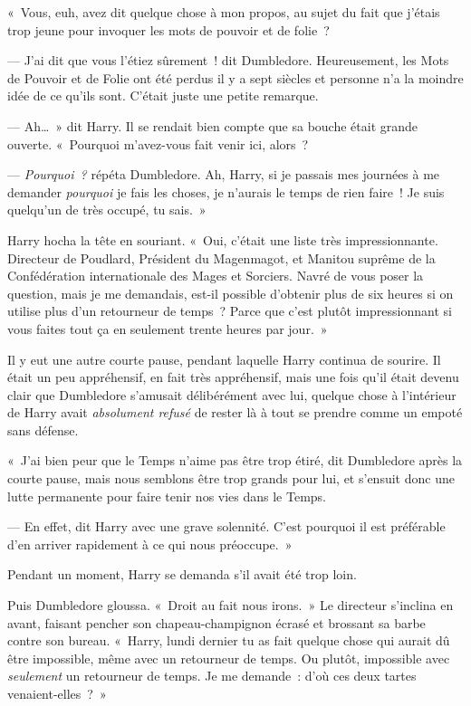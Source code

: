«~Vous, euh, avez dit quelque chose à mon propos, au sujet du fait que j'étais trop jeune pour invoquer les mots de pouvoir et de folie~?

--- J'ai dit que vous l'étiez sûrement~! dit Dumbledore. Heureusement, les Mots de Pouvoir et de Folie ont été perdus il y a sept siècles et personne n'a la moindre idée de ce qu'ils sont. C'était juste une petite remarque.

--- Ah…~» dit Harry. Il se rendait bien compte que sa bouche était grande ouverte. «~Pourquoi m'avez-vous fait venir ici, alors~?

--- \emph{Pourquoi~?} répéta Dumbledore. Ah, Harry, si je passais mes journées à me demander \emph{pourquoi} je fais les choses, je n'aurais le temps de rien faire~! Je suis quelqu'un de très occupé, tu sais.~»

Harry hocha la tête en souriant. «~Oui, c'était une liste très impressionnante. Directeur de Poudlard, Président du Magenmagot, et Manitou suprême de la Confédération internationale des Mages et Sorciers. Navré de vous poser la question, mais je me demandais, est-il possible d'obtenir plus de six heures si on utilise plus d'un retourneur de temps~? Parce que c'est plutôt impressionnant si vous faites tout ça en seulement trente heures par jour.~»

Il y eut une autre courte pause, pendant laquelle Harry continua de sourire. Il était un peu appréhensif, en fait très appréhensif, mais une fois qu'il était devenu clair que Dumbledore s'amusait délibérément avec lui, quelque chose à l'intérieur de Harry avait \emph{absolument refusé} de rester là à tout se prendre comme un empoté sans défense.

«~J'ai bien peur que le Temps n'aime pas être trop étiré, dit Dumbledore après la courte pause, mais nous semblons être trop grands pour lui, et s'ensuit donc une lutte permanente pour faire tenir nos vies dans le Temps.

--- En effet, dit Harry avec une grave solennité. C'est pourquoi il est préférable d'en arriver rapidement à ce qui nous préoccupe.~»

Pendant un moment, Harry se demanda s'il avait été trop loin.

Puis Dumbledore gloussa. «~Droit au fait nous irons.~» Le directeur s'inclina en avant, faisant pencher son chapeau-champignon écrasé et brossant sa barbe contre son bureau. «~Harry, lundi dernier tu as fait quelque chose qui aurait dû être impossible, même avec un retourneur de temps. Ou plutôt, impossible avec \emph{seulement} un retourneur de temps. Je me demande~: d'où ces deux tartes venaient-elles~?~»

